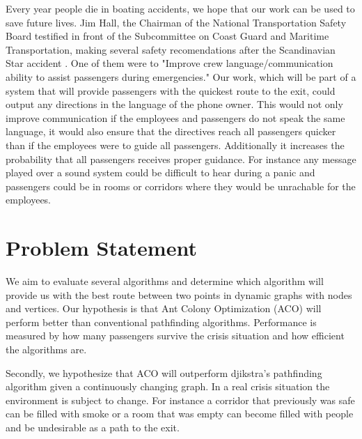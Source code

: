 Every year people die in boating accidents, we hope that our work can be                                                                         %
used to save future lives. Jim Hall, the Chairman of the National Transportation 
Safety Board testified in front of the Subcommittee on Coast Guard and Maritime 
Transportation, making several safety recomendations after the Scandinavian Star
accident \cite{ntsb}. One of them were to "Improve crew language/communication 
ability to assist passengers during emergencies." Our work, which will be part of a system
that will provide passengers with the quickest route to the exit, could output 
any directions in the language of the phone owner. This would not only improve 
communication if the employees and passengers do not speak the same language, 
it would also ensure that the directives reach all passengers quicker than if the employees 
were to guide all passengers. Additionally it increases the probability that all passengers 
receives proper guidance. For instance any message played over a sound system could be
difficult to hear during a panic and passengers could be in rooms or corridors
where they would be unrachable for the employees.



\section{Problem Statement}

We aim to evaluate several algorithms and determine which algorithm will provide us with the         %
best route between two points in dynamic graphs with nodes and vertices. Our hypothesis
is that Ant Colony Optimization (ACO) will perform better than conventional pathfinding
algorithms. Performance is measured by how many passengers survive the crisis situation
and how efficient the algorithms are. 

Secondly, we hypothesize that ACO will outperform djikstra's pathfinding algorithm
given a continuously changing graph. In a real crisis situation the environment is subject
to change. For instance a corridor that previously was safe can be filled with smoke
or a room that was empty can become filled with people and be undesirable as a path
to the exit.

